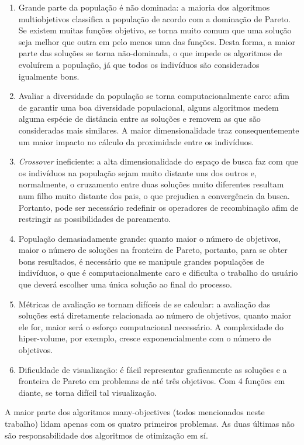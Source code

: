 \begin{enumerate}  
	\item Grande parte da população é não dominada: a maioria dos algoritmos multiobjetivos classifica a população de acordo com a dominação de Pareto. Se existem muitas funções objetivo, se torna muito comum que uma solução seja melhor que outra em pelo menos uma das funções. Desta forma, a maior parte das soluções se torna não-dominada, o que impede os algoritmos de evoluírem a população, já que todos os indivíduos são considerados igualmente bons.
	\item Avaliar a diversidade da população se torna computacionalmente caro: afim de garantir uma boa diversidade populacional, alguns algoritmos medem alguma espécie de distância entre as soluções e removem as que são consideradas mais similares. A maior dimensionalidade traz consequentemente um maior impacto no cálculo da proximidade entre os indivíduos. 
	\item \textit{Crossover} ineficiente: a alta dimensionalidade do espaço de busca faz com que os indivíduos na população sejam muito distante uns dos outros e, normalmente, o cruzamento entre duas soluções muito diferentes resultam num filho muito distante dos pais, o que prejudica a convergência da busca. Portanto, pode ser necessário redefinir os operadores de recombinação afim de restringir as possibilidades de pareamento.
	\item População demasiadamente grande: quanto maior o número de objetivos, maior o número de soluções na fronteira de Pareto, portanto, para se obter bons resultados, é necessário que se manipule grandes populações de indivíduos, o que é computacionalmente caro e dificulta o trabalho do usuário que deverá escolher uma única solução ao final do processo.
	\item Métricas de avaliação se tornam difíceis de se calcular: a avaliação das soluções está diretamente relacionada ao número de objetivos, quanto maior ele for, maior será o esforço computacional necessário. A complexidade do hiper-volume, por exemplo, cresce exponencialmente com o número de objetivos.
	\item Dificuldade de visualização: é fácil representar graficamente as soluções e a fronteira de Pareto em problemas de até três objetivos. Com 4 funções em diante, se torna difícil tal visualização.
\end{enumerate}

A maior parte dos algoritmos many-objectives (todos mencionados neste trabalho) lidam apenas com os quatro primeiros problemas. As duas últimas não são responsabilidade dos algoritmos de otimização em sí.

